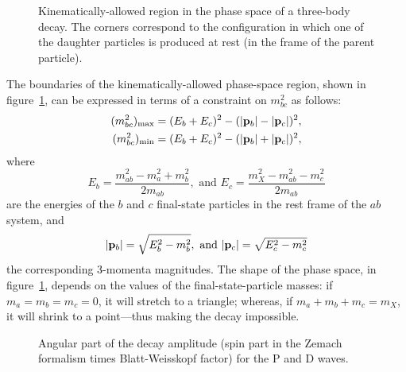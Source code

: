     \begin{figure}
        \centering
        
        \caption{Kinematically-allowed region in the phase space of a three-body decay. The corners correspond to the configuration in which one of the daughter particles is produced at rest (in the frame of the parent particle).}
        \label{fig:dalitz_kinematically_allowed}
    \end{figure}
    The boundaries of the kinematically-allowed phase-space region, shown in figure~\ref{fig:dalitz_kinematically_allowed}, can be expressed in terms of a constraint on $m_{bc}^2$ as follows:
    \begin{equation}
        \begin{aligned}
            (m_{bc}^2)_{\text{max}} &= (E_b + E_c)^2 - (\lvert\mathbf{{p}}_b\rvert - \lvert\mathbf{{p}}_c\rvert)^2,\\
            (m_{bc}^2)_{\text{min}} &= (E_b + E_c)^2 - (\lvert\mathbf{{p}}_b\rvert + \lvert\mathbf{{p}}_c\rvert)^2,
        \end{aligned}
    \end{equation}
    where
    \begin{equation}
        E_b = \frac{m_{ab}^2 - m_a^2 + m_b^2}{2m_{ab}},\text{ and }
        E_c = \frac{m_X^2 - m_{ab}^2 - m_c^2}{2 m_{ab}}
    \end{equation}
    are the energies of the $b$ and $c$ final-state particles in the rest frame of the $ab$ system, and
    \begin{equation}
        \lvert\mathbf{{p}}_b\rvert = \sqrt{E_b^2 - m_b^2},\text{ and }
        \lvert\mathbf{{p}}_c\rvert = \sqrt{E_c^2 - m_c^2}
    \end{equation}
    the corresponding 3-momenta magnitudes.
    The shape of the phase space, in figure~\ref{fig:dalitz_kinematically_allowed}, depends on the values of the final-state-particle masses:
    if $m_a = m_b = m_c = 0$, it will stretch to a triangle; whereas, if $m_a + m_b + m_c = m_X$, it will shrink to a point---thus making the decay impossible.

    \begin{figure}
        \centering

        \subfloat[]%
                 [P wave.]%
                 {}

        \subfloat[]%
                 [D wave.]%
                 {}

        \caption{Angular part of the decay amplitude (spin part in the Zemach formalism times Blatt-Weisskopf factor) for the P and D waves.}
        \label{fig:dalitz_angular_parts}
    \end{figure}
